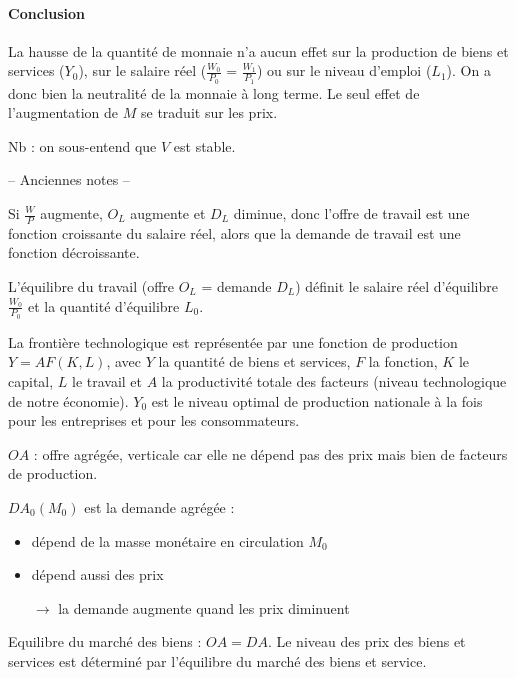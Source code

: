 	\paragraph{Conclusion}
	
	La hausse de la quantité de monnaie n'a aucun effet sur la production de biens et services ($Y_0$), sur le salaire réel ($\frac{W_0}{P_0}$ = $\frac{W_1}{P_1}$) ou sur le niveau d'emploi ($L_1$). On a donc bien la neutralité de la monnaie à long terme. Le seul effet de l'augmentation de $M$ se traduit sur les prix.
	
	Nb : on sous-entend que $V$ est stable.
	
	\bigbreak
	\begin{center}
	-- Anciennes notes --
	\end{center}
	
	Si $\frac{W}{P}$ augmente, $O_L$ augmente et $D_L$ diminue, donc l'offre de travail est une fonction croissante du salaire réel, alors que la demande de travail est une fonction décroissante.
	
	L'équilibre du travail (offre $O_L$ = demande $D_L$) définit le salaire réel d'équilibre $\frac{W_0}{P_0}$ et la quantité d'équilibre $L_0$.
	
	La frontière technologique est représentée par une fonction de production $Y = A F(K, L)$, avec $Y$ la quantité de biens et services, $F$ la fonction, $K$ le capital, $L$ le travail et $A$ la productivité totale des facteurs (niveau technologique de notre économie). $Y_0$ est le niveau optimal de production nationale à la fois pour les entreprises et pour les consommateurs.                                                                                                                                                                            
	
	$OA$ : offre agrégée, verticale car elle ne dépend pas des prix mais bien de facteurs de production.
	
	$DA_0(M_0)$ est la demande agrégée :
	
	\begin{itemize}
		\item dépend de la masse monétaire en circulation $M_0$
		\item dépend aussi des prix
		\item[$\rightarrow$] la demande augmente quand les prix diminuent
	\end{itemize}
	
	Equilibre du marché des biens : $OA = DA$. Le niveau des prix des biens et services est déterminé par l'équilibre du marché des biens et service.
	
